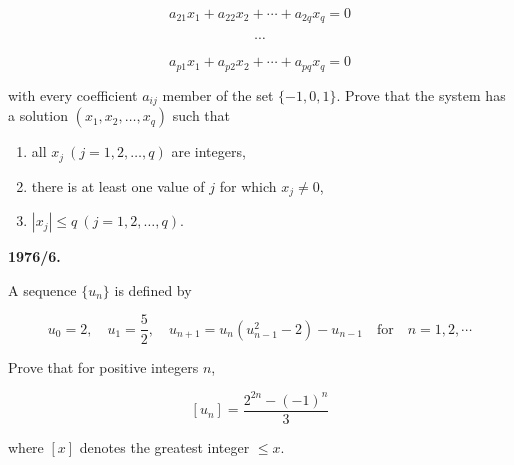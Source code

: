 \documentclass[12pt]{article}
\begin{document}
$$
a_{21}x_1+a_{22}x_2+\cdots+a_{2q}x_q=0
$$

$$
\cdots
$$

$$
a_{p1}x_1+a_{p2}x_2+\cdots+a_{pq}x_q=0
$$

with every coefficient $a_{ij}$ member of the set $\{-1,0,1\}$. Prove that the system has a solution $(x_1,x_2,\ldots,x_q)$ such that

\begin{enumerate}
\item[(a)] all $x_j \ (j=1,2,\ldots,q)$ are integers,

\item[(b)] there is at least one value of $j$ for which $x_j\neq0$,

\item[(c)] $|x_j|\leq q \ (j=1,2,\ldots,q)$.
\end{enumerate}

\vspace{0.4cm}

\textbf{1976/6.}

A sequence $\{u_n\}$ is defined by

$$
u_0=2,\quad u_1=\frac{5}{2},\quad
u_{n+1}=u_n(u_{n-1}^2-2)-u_{n-1}
\quad \text{for} \quad n=1,2,\cdots
$$

Prove that for positive integers $n$,

$$
[u_n]=\frac{2^{2n}-(-1)^n}{3}
$$

where $[x]$ denotes the greatest integer $\leq x$.
\end{document}
